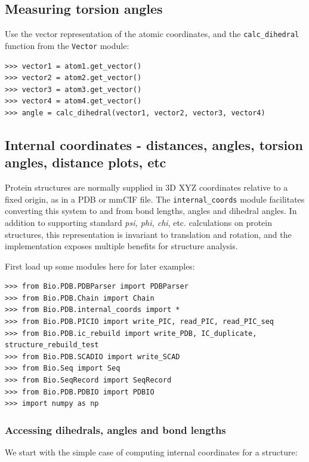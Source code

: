 \subsection{Measuring torsion angles}
Use the vector representation of the atomic coordinates, and
the \texttt{calc\_dihedral} function from the \texttt{Vector} module:
\begin{verbatim}
>>> vector1 = atom1.get_vector()
>>> vector2 = atom2.get_vector()
>>> vector3 = atom3.get_vector()
>>> vector4 = atom4.get_vector()
>>> angle = calc_dihedral(vector1, vector2, vector3, vector4)
\end{verbatim}

\subsection{Internal coordinates - distances, angles, torsion angles, distance plots, etc}
\label{sec:internal_coordinates}

Protein structures are normally supplied in 3D XYZ coordinates relative to a fixed origin, as in a PDB or mmCIF file.
The \texttt{internal\_coords} module facilitates converting this system to and from bond lengths, angles and dihedral
angles.  In addition to supporting standard \textit{psi, phi, chi}, etc. calculations on protein structures, this
representation is invariant to translation and rotation, and the implementation exposes multiple benefits for
structure analysis.

First load up some modules here for later examples:

\begin{verbatim}
>>> from Bio.PDB.PDBParser import PDBParser
>>> from Bio.PDB.Chain import Chain
>>> from Bio.PDB.internal_coords import *
>>> from Bio.PDB.PICIO import write_PIC, read_PIC, read_PIC_seq
>>> from Bio.PDB.ic_rebuild import write_PDB, IC_duplicate, structure_rebuild_test
>>> from Bio.PDB.SCADIO import write_SCAD
>>> from Bio.Seq import Seq
>>> from Bio.SeqRecord import SeqRecord
>>> from Bio.PDB.PDBIO import PDBIO
>>> import numpy as np
\end{verbatim}

\subsubsection{Accessing dihedrals, angles and bond lengths}

We start with the simple case of computing internal coordinates for a structure:

